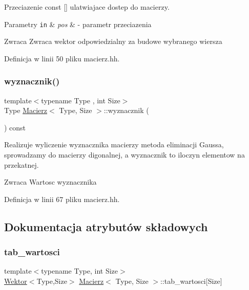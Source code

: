 Przeciazenie const \mbox{[}\mbox{]} ulatwiajace dostep do macierzy. 


\begin{DoxyParams}[1]{Parametry}
\mbox{\tt in}  & {\em pos} & -\/ parametr przeciazenia \\
\hline
\end{DoxyParams}
\begin{DoxyReturn}{Zwraca}
Zwraca wektor odpowiedzialny za budowe wybranego wiersza 
\end{DoxyReturn}


Definicja w linii 50 pliku macierz.\+hh.

\mbox{\label{class_macierz_a24a6eb57bea1568d7e4aecc342bb2461}} 
\subsubsection{\texorpdfstring{wyznacznik()}{wyznacznik()}}
{\footnotesize\ttfamily template$<$typename Type , int Size$>$ \\
Type \hyperlink{class_macierz}{Macierz}$<$ Type, Size $>$\+::wyznacznik (\begin{DoxyParamCaption}{ }\end{DoxyParamCaption}) const}



Realizuje wyliczenie wyznacznika macierzy metoda eliminacji Gaussa, sprowadzamy do macierzy digonalnej, a wyznacznik to iloczyn elementow na przekatnej. 

\begin{DoxyReturn}{Zwraca}
Wartosc wyznacznika 
\end{DoxyReturn}


Definicja w linii 67 pliku macierz.\+hh.



\subsection{Dokumentacja atrybutów składowych}
\mbox{\label{class_macierz_afa921845c2803b6105c5ac0ae3defa3d}} 
\subsubsection{\texorpdfstring{tab\+\_\+wartosci}{tab\_wartosci}}
{\footnotesize\ttfamily template$<$typename Type, int Size$>$ \\
\hyperlink{class_wektor}{Wektor}$<$Type,Size$>$ \hyperlink{class_macierz}{Macierz}$<$ Type, Size $>$\+::tab\+\_\+wartosci\mbox{[}Size\mbox{]}\hspace{0.3cm}{\ttfamily [private]}}



